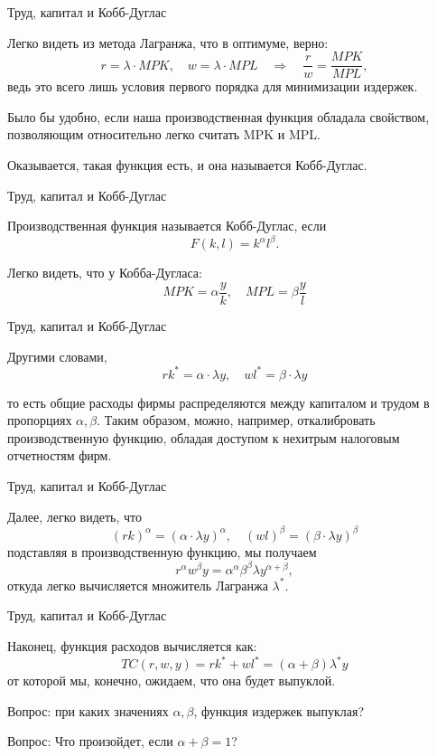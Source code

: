 \documentclass{beamer}
\begin{document}
\begin{frame}{Труд, капитал и Кобб-Дуглас}

Легко видеть из метода Лагранжа, что в оптимуме, верно:
$$ r = \lambda \cdot MPK, \quad w = \lambda \cdot MPL \quad \Rightarrow \quad \frac{r}{w} = \frac{MPK}{MPL},$$
ведь это всего лишь условия первого порядка для минимизации издержек.

Было бы удобно, если наша производственная функция обладала свойством, позволяющим относительно легко считать MPK и MPL. 

Оказывается, такая функция есть, и она называется Кобб-Дуглас.

\end{frame}

\begin{frame}{Труд, капитал и Кобб-Дуглас}

\begin{definition}
Производственная функция называется \alert{Кобб-Дуглас}, если 
$$ F(k,l) = k^{\alpha} l^{\beta}.$$
\end{definition}

Легко видеть, что у Кобба-Дугласа:
$$ MPK = \alpha \frac{y}{k}, \quad  MPL = \beta \frac{y}{l}$$

\end{frame}

\begin{frame}{Труд, капитал и Кобб-Дуглас}

Другими словами,
$$ r k^{\ast} = \alpha \cdot \lambda y, \quad w l^{\ast} = \beta \cdot \lambda y$$

то есть общие расходы фирмы распределяются между капиталом и трудом в пропорциях $\alpha, \beta$. Таким образом, можно, например, откалибровать производственную функцию, обладая доступом к нехитрым налоговым отчетностям фирм.

\end{frame}

\begin{frame}{Труд, капитал и Кобб-Дуглас}

Далее, легко видеть, что 
$$(r k)^{\alpha} = (\alpha \cdot \lambda y)^{\alpha}, \quad (w l)^{\beta} = (\beta \cdot \lambda y)^{\beta}$$
подставляя в производственную функцию, мы получаем
$$ r^{\alpha}w^{\beta} y = \alpha^{\alpha} \beta^{\beta} \lambda y^{\alpha + \beta},$$
откуда легко вычисляется множитель Лагранжа $\lambda^{\ast}$.

\end{frame}

\begin{frame}{Труд, капитал и Кобб-Дуглас}

Наконец, функция расходов вычисляется как:
$$ TC(r,w,y) = r k^{\ast} + w l^{\ast} = (\alpha + \beta) \lambda^{\ast} y$$
от которой мы, конечно, ожидаем, что она будет выпуклой.

Вопрос: при каких значениях $\alpha, \beta$, функция издержек выпуклая? 

Вопрос: Что произойдет, если $\alpha + \beta = 1$?

\end{frame}
\end{document}
